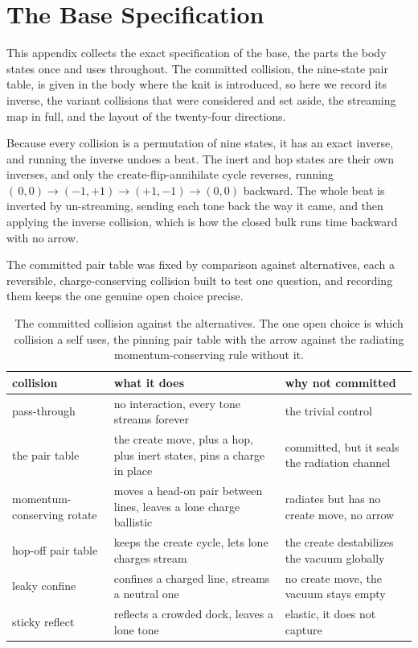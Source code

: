 \section{The Base Specification}
\label{app:base}

This appendix collects the exact specification of the base, the parts the body states once and uses throughout. The committed collision, the nine-state pair table, is given in the body where the knit is introduced, so here we record its inverse, the variant collisions that were considered and set aside, the streaming map in full, and the layout of the twenty-four directions.

Because every collision is a permutation of nine states, it has an exact inverse, and running the inverse undoes a beat. The inert and hop states are their own inverses, and only the create-flip-annihilate cycle reverses, running $(\,0,0) \to (-1,+1) \to (+1,-1) \to (0,0)$ backward. The whole beat is inverted by un-streaming, sending each tone back the way it came, and then applying the inverse collision, which is how the closed bulk runs time backward with no arrow.

The committed pair table was fixed by comparison against alternatives, each a reversible, charge-conserving collision built to test one question, and recording them keeps the one genuine open choice precise.

\begin{table}[ht]
\centering
\small
\begin{tabular}{@{}lp{}p{}@{}}
\toprule
collision & what it does & why not committed \\
\midrule
pass-through & no interaction, every tone streams forever & the trivial control \\
the pair table & the create move, plus a hop, plus inert states, pins a charge in place & committed, but it seals the radiation channel \\
momentum-conserving rotate & moves a head-on pair between lines, leaves a lone charge ballistic & radiates but has no create move, no arrow \\
hop-off pair table & keeps the create cycle, lets lone charges stream & the create destabilizes the vacuum globally \\
leaky confine & confines a charged line, streams a neutral one & no create move, the vacuum stays empty \\
sticky reflect & reflects a crowded dock, leaves a lone tone & elastic, it does not capture \\
\bottomrule
\end{tabular}
\caption{The committed collision against the alternatives. The one open choice is which collision a self uses, the pinning pair table with the arrow against the radiating momentum-conserving rule without it.}
\label{tab:variants}
\end{table}

